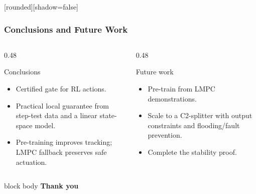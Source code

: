 \documentclass[aspectratio=169]{beamer}
\begin{document}
\begin{frame}
[rounded][shadow=false]
\frametitle{\large \textbf{Conclusions and Future Work}}
\normalsize

\vspace{-0.18cm}
\begin{columns}[T,onlytextwidth]

\begin{column}{0.48\textwidth}
\begin{block}{Conclusions}
\begin{itemize}\raggedright
  \setlength\itemsep{0.85ex}
  \item Certified gate for RL actions.
  \item Practical local guarantee from step-test data and a linear state-space model.
  \item Pre-training improves tracking; LMPC fallback preserves safe actuation.
\end{itemize}
\end{block}
\end{column}

\begin{column}{0.48\textwidth}
\begin{block}{Future work}
\begin{itemize}\raggedright
  \setlength\itemsep{0.85ex}
  \item Pre-train from LMPC demonstrations.
  \item Scale to a C2-splitter with output constraints and flooding/fault prevention.
  \item Complete the stability proof.
\end{itemize}
\end{block}
\end{column}

\end{columns}

\vfill
\begin{beamercolorbox}[rounded=true,center,sep=5pt,wd=0.96\linewidth]{block body}
{\LARGE \bfseries Thank you}
\end{beamercolorbox}

\end{frame}

\iffalse
\end{document}
